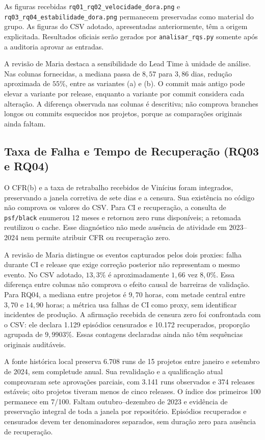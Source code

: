 \documentclass[12pt]{article}
\begin{document}
As figuras recebidas \texttt{rq01\_rq02\_velocidade\_dora.png} e \texttt{rq03\_rq04\_estabilidade\_dora.png} permanecem preservadas como material do grupo. As figuras do CSV adotado, apresentadas anteriormente, têm a origem explicitada. Resultados oficiais serão gerados por \texttt{analisar\_rqs.py} somente após a auditoria aprovar as entradas.

A revisão de Maria destaca a sensibilidade do Lead Time à unidade de análise. Nas colunas fornecidas, a mediana passa de $8{,}57$ para $3{,}86$ dias, redução aproximada de $55\%$, entre as variantes (a) e (b). O commit mais antigo pode elevar a variante por release, enquanto a variante por commit considera cada alteração. A diferença observada nas colunas é descritiva; não comprova branches longos ou commits esquecidos nos projetos, porque as comparações originais ainda faltam.

\subsection{Taxa de Falha e Tempo de Recuperação (RQ03 e RQ04)}
O CFR(b) e a taxa de retrabalho recebidos de Vinícius foram integrados, preservando a janela corretiva de sete dias e a censura. Sua existência no código não comprova os valores do CSV. Para CI e recuperação, a consulta de \texttt{psf/black} enumerou 12 meses e retornou zero runs disponíveis; a retomada reutilizou o cache. Esse diagnóstico não mede ausência de atividade em 2023--2024 nem permite atribuir CFR ou recuperação zero.

A revisão de Maria distingue os eventos capturados pelos dois proxies: falha durante CI e release que exige correção posterior não representam o mesmo evento. No CSV adotado, $13{,}3\%$ é aproximadamente $1{,}66$ vez $8{,}0\%$. Essa diferença entre colunas não comprova o efeito causal de barreiras de validação. Para RQ04, a mediana entre projetos é $9{,}70$ horas, com metade central entre $3{,}70$ e $14{,}90$ horas; a métrica usa falhas de CI como proxy, sem identificar incidentes de produção. A afirmação recebida de censura zero foi confrontada com o CSV: ele declara 1.129 episódios censurados e 10.172 recuperados, proporção agrupada de $9{,}9903\%$. Essas contagens declaradas ainda não têm sequências originais auditáveis.

A fonte histórica local preserva 6.708 runs de 15 projetos entre janeiro e setembro de 2024, sem completude anual. Sua revalidação e a qualificação atual comprovaram sete aprovações parciais, com 3.141 runs observados e 374 releases estáveis; oito projetos tiveram menos de cinco releases. O índice dos primeiros 100 permanece em 7/100. Faltam outubro--dezembro de 2023 e evidência de preservação integral de toda a janela por repositório. Episódios recuperados e censurados devem ter denominadores separados, sem duração zero para ausência de recuperação.
\end{document}
